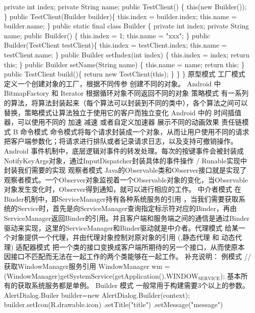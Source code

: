 \documentclass[9pt, b5paper]{article}
\begin{document}
    private int index;
    private String name;
    public TestClient() \{
        this(new Builder());
    \}
    public TestClient(Builder builder)\{
        this.index = builder.index;
        this.name = builder.name;
    \}
    public static final class Builder \{
        private int index;
        private String name;
        public Builder() \{
            this.index = 1;
            this.name = "xxx";
        \}
        public Builder(TestClient testClient)\{
            this.index = testClient.index;
            this.name = testClient.name;
        \}
        public Builder setIndex(int index) \{
            this.index = index;
            return this;
        \}
        public Builder setName(String name) \{
            this.name = name;
            return this;
        \}
        public TestClient build()\{
            return new TestClient(this);
        \}
    \}
\}
原型模式
工厂模式
定义一个创建对象的工厂，根据不同传参 创建不同的对象。
Android 中 BitmapFactory 和 Iterator 根据循环对象不同返回不同的对象
策略模式
有一系列的算法，将算法封装起来（每个算法可以封装到不同的类中），各个算法之间可以替换，策略模式让算法独立于使用它的客户而独立变化
Android 中的 时间插值器，可以使用不同的 加速 减速 或者自定义加速器 展示不同的动画效果
责任链模式
B
命令模式
命令模式将每个请求封装成一个对象，从而让用户使用不同的请求把客户端参数化；将请求进行排队或者记录请求日志，以及支持可撤销操作。
Android 事件机制中，底层逻辑对事件的转发处理。每次的按键事件会被封装成NotifyKeyArgs对象，通过InputDispatcher封装具体的事件操作 / Runable实现中封装我们需要的实现
观察者模式
Java的Observable类和Observer接口就是实现了观察者模式。一个Observer对象监视着一个Observable对象的变化，当Observable对象发生变化时，Observer得到通知，就可以进行相应的工作。
中介者模式
在Binder机制中，即ServiceManager持有各种系统服务的引用 ，当我们需要获取系统的Service时，首先是向ServiceManager查询指定标示符对应的Binder，再由ServiceManager返回Binder的引用。并且客户端和服务端之间的通信是通过Binder驱动来实现，这里的ServiceManager和Binder驱动就是中介者。代理模式
给某一个对象提供一个代理，并由代理对象控制对原对象的引用 (,静态代理 和 动态代理)
适配器模式
把一个类的接口变换成客户端所期待的另一个接口，从而使原本因接口不匹配而无法在一起工作的两个类能够在一起工作。
补充说明：
例模式
//获取WindowManager服务引用
WindowManager wm = (WindowManager)getSystemService(getApplication().WINDOW$_{\text{SERVICE}}$);  
基本所有的获取系统服务都是单例。
Builder 模式
一般常用于构建需要3个以上的参数。
AlertDialog.Builer builder=new AlertDialog.Builder(context); 
builder.setIcon(R.drawable.icon) 
 .setTitle("title") 
 .setMessage("message") 
\end{document}

